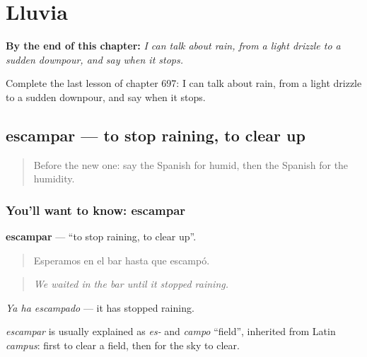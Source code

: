 
\chapter{Lluvia}
\label{ch:es-lluvia}

\begin{chapteropening}
\textbf{By the end of this chapter:} \emph{I can talk about rain, from a light drizzle to a sudden downpour, and say when it stops.}

Complete the last lesson of chapter 697: I can talk about rain, from a light drizzle to a sudden downpour, and say when it stops.
\end{chapteropening}

\section[escampar]{escampar — to stop raining, to clear up}

\label{lesson:ES-C697-escampar}



\begin{quote}
Before the new one: say the Spanish for humid, then the Spanish for the humidity.
\end{quote}

\subsection*{You'll want to know: escampar}
\textbf{escampar} — \textquotedblleft{}to stop raining, to clear up\textquotedblright{}.

\begin{quote}
Esperamos en el bar hasta que escampó.
\end{quote}

\begin{quote}
\emph{We waited in the bar until it stopped raining.}
\end{quote}

\emph{Ya ha escampado} — it has stopped raining.

\begin{cousinweb}
\emph{escampar} is usually explained as \emph{es-} and \emph{campo} \textquotedblleft{}field\textquotedblright{}, inherited from Latin \emph{campus}: first to clear a field, then for the sky to clear.
\end{cousinweb}

